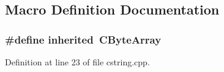 \subsection{Macro Definition Documentation}
\subsubsection[{inherited}]{\setlength{\rightskip}{0pt plus 5cm}\#define inherited~C\+Byte\+Array}\label{cstring_8cpp_a3920e3b7cb0909b941b2409493acf8f1}


Definition at line 23 of file cstring.\+cpp.

